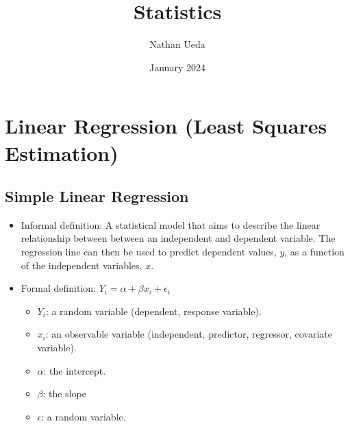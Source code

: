 \documentclass{article}
\title{Statistics}
\author{Nathan Ueda}
\date{January 2024}
\begin{document}
\maketitle

\section{Linear Regression (Least Squares Estimation)}

\subsection{Simple Linear Regression}
    \begin{itemize}
        \item Informal definition: A statistical model that aims to describe the
        linear relationship between between an independent and dependent 
        variable. The regression line can then be used to predict dependent
        values, $ y $, as a function of the independent variables, $ x $.
        \item Formal definition: $ Y_i = \alpha + \beta x_i + \epsilon_i $
        \begin{itemize}
            \item $ Y_i $: a random variable (dependent, response variable).
            \item $ x_i $: an observable variable (independent, predictor, 
            regressor, covariate variable).
            \item $ \alpha $: the intercept.
            \item $ \beta $: the slope
            \item $ \epsilon $: a random variable.
        \end{itemize}
    \end{itemize}
\end{document}
